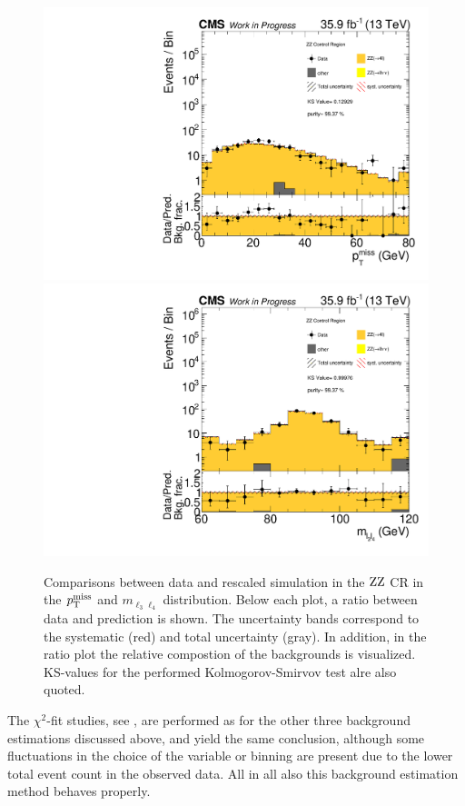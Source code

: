 \begin{figure}[tbp]
 \centering
 \includegraphics[width=\pairwidth]{figures/plots_CR_zz/CRZZ_LL_nom_met_log}
 \includegraphics[width=\pairwidth]{figures/plots_CR_zz/CRZZ_LL_nom_m_ll2_log}
 \caption{Comparisons between data and rescaled simulation in the $\mathrm{Z}\mathrm{Z}$ CR in the $p_{\mathrm{T}}^\text{miss}$ and $m_{\ell_3\ell_4}$ distribution. Below each plot, a ratio between data and prediction is shown. The uncertainty bands correspond to the systematic (red) and total uncertainty (gray). In addition, in the ratio plot the relative compostion of the backgrounds is visualized. KS-values for the performed Kolmogorov-Smirvov test alre also quoted.}
 \label{fig:CRZZ}
\end{figure}
The $\chi^2$-fit studies, see , are performed as for the other three background estimations discussed above, and yield the same conclusion, although some fluctuations in the choice of the variable or binning are present due to the lower total event count in the observed data. All in all also this background estimation method behaves properly.
